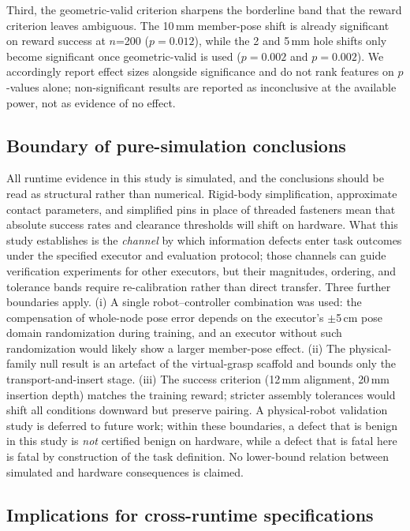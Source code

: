 Third, the geometric-valid criterion sharpens the borderline band that the
reward criterion leaves ambiguous. The 10\,mm member-pose shift is already
significant on reward success at $n$=200 ($p=0.012$), while the 2 and 5\,mm
hole shifts only become significant once geometric-valid is used
($p=0.002$ and $p=0.002$). We accordingly report effect sizes alongside
significance and do not rank features on $p$-values alone; non-significant
results are reported as inconclusive at the available power, not as evidence
of no effect.

\subsection{Boundary of pure-simulation conclusions}
\label{sec:boundary}

All runtime evidence in this study is simulated, and the conclusions should
be read as structural rather than numerical. Rigid-body simplification,
approximate contact parameters, and simplified pins in place of threaded
fasteners mean that absolute success rates and clearance thresholds will
shift on hardware. What this study establishes is the \emph{channel} by which
information defects enter task outcomes under the specified executor and
evaluation protocol; those channels can guide verification experiments for
other executors, but their magnitudes, ordering, and tolerance bands require
re-calibration rather than direct transfer. Three further boundaries apply.
(i) A single
robot--controller combination was used: the compensation of whole-node pose
error depends on the executor's $\pm$5\,cm pose domain randomization during
training, and an executor without such randomization would likely show a
larger member-pose effect. (ii) The physical-family null result is an
artefact of the virtual-grasp scaffold and bounds only the
transport-and-insert stage. (iii) The success criterion (12\,mm alignment,
20\,mm insertion depth) matches the training reward; stricter assembly
tolerances would shift all conditions downward but preserve pairing. A
physical-robot validation study is deferred to future work; within these
boundaries, a defect that is benign in this study is \emph{not} certified
benign on hardware, while a defect that is fatal here is fatal by
construction of the task definition. No lower-bound relation between
simulated and hardware consequences is claimed.

\subsection{Implications for cross-runtime specifications}
\label{sec:cross-runtime}

